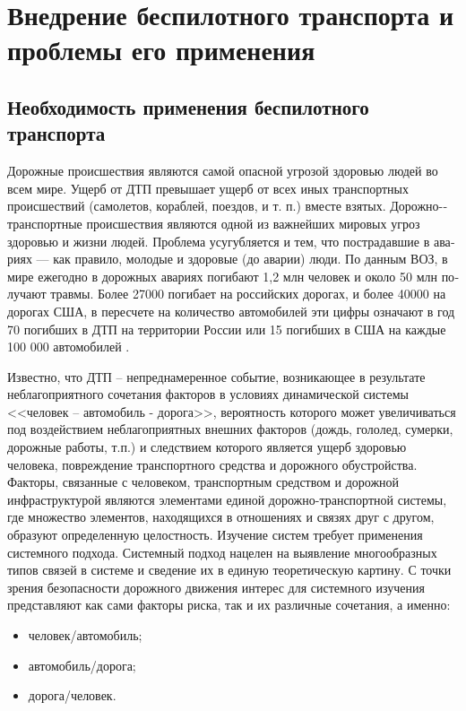 \chapter{Внедрение беспилотного транспорта и проблемы его применения} \label{chapt2}

\section{Необходимость применения беспилотного транспорта} \label{sect_Need}

Дорожные происшествия являются самой опасной
угрозой здоровью людей во всем мире. Ущерб от ДТП превышает
ущерб от всех иных транспортных происшествий (само­летов,
кораблей, поездов, и т. п.) вместе взятых. До­рожно-­транспортные
происшествия являются одной из
важнейших мировых угроз здоровью и жизни людей.
Проблема усугубляется и тем, что пострадавшие в ава­риях — как правило, 
молодые и здоровые (до аварии)
люди. По данным ВОЗ, в мире ежегодно в дорожных
авариях погибают 1,2 млн человек и около 50 млн по­лучают 
травмы. Более 27000 погибает на российских
дорогах, и более 40000 на дорогах США, в пересчете
на количество автомобилей эти цифры означают в год
70 погибших в ДТП на территории России или 15 по­гибших 
в США на каждые 100 000 автомобилей \cite{DTP_ukr}.

Известно, что ДТП – непреднамеренное событие, возникающее в результате 
неблагоприятного сочетания факторов в
условиях динамической системы <<человек – автомобиль - дорога>>, вероятность 
которого может увеличиваться под
воздействием неблагоприятных внешних факторов (дождь, гололед, сумерки, дорожные 
работы, т.п.) и следствием
которого является ущерб здоровью человека, повреждение транспортного средства и 
дорожного обустройства.
Факторы, связанные с человеком, транспортным средством и дорожной 
инфраструктурой являются элементами единой
дорожно-транспортной системы, где множество элементов, находящихся в отношениях 
и связях друг с другом,
образуют определенную целостность. Изучение систем требует применения системного 
подхода. Системный подход
нацелен на выявление многообразных типов связей в системе и сведение их в единую 
теоретическую картину.
С точки зрения безопасности дорожного движения интерес для системного изучения 
представляют как сами факторы
риска, так и их различные сочетания, а именно:
\begin{itemize}
  \item человек/автомобиль;
  \item автомобиль/дорога;
  \item дорога/человек.
\end{itemize}

